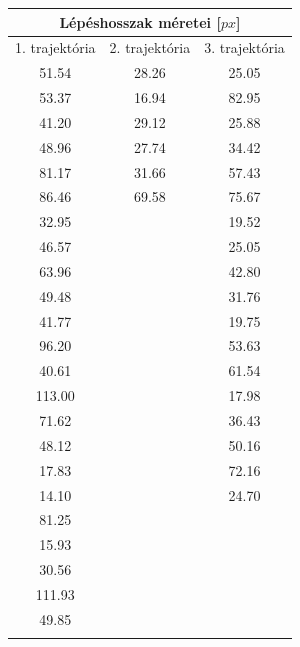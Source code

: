 \begin{multicols}{2}
\begin{tabular}{||c|c|c||}
    \toprule
    \multicolumn{3}{||c||}{Lépéshosszak méretei [$px$]} \\
    \hline
    1. trajektória  & 2. trajektória  & 3. trajektória \\ \hline \hline
    51.54           & 28.26           & 25.05          \\ \hline
    53.37           & 16.94           & 82.95          \\ \hline
    41.20           & 29.12           & 25.88          \\ \hline
    48.96           & 27.74           & 34.42          \\ \hline
    81.17           & 31.66           & 57.43          \\ \hline
    86.46           & 69.58           & 75.67          \\ \hline
    32.95           &                 & 19.52          \\ \hline
    46.57           &                 & 25.05          \\ \hline
    63.96           &                 & 42.80          \\ \hline
    49.48           &                 & 31.76          \\ \hline
    41.77           &                 & 19.75          \\ \hline
    96.20           &                 & 53.63          \\ \hline
    40.61           &                 & 61.54          \\ \hline
    113.00          &                 & 17.98          \\ \hline
    71.62           &                 & 36.43          \\ \hline
    48.12           &                 & 50.16          \\ \hline
    17.83           &                 & 72.16          \\ \hline
    14.10           &                 & 24.70          \\ \hline
    81.25           &                 &                \\ \hline
    15.93           &                 &                \\ \hline
    30.56           &                 &                \\ \hline
    111.93          &                 &                \\ \hline
    49.85           &                 &                \\ \hline
                    &                 &                \\
    \bottomrule
\end{tabular}
\end{multicols}
\hfill


